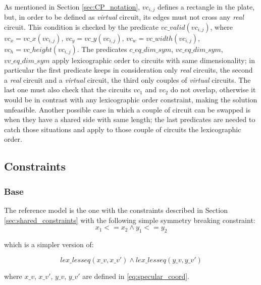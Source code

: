 \hfill \\
As mentioned in Section \ref{sec:CP_notation}, $vc_{i,j}$ defines a rectangle in the plate, but, in order to
be defined as \textit{virtual} circuit, its edges must not cross any \textit{real} circuit.
This condition is checked by the predicate $vc\_valid(vc_{i,j})$, where
$vc_x = vc\_x(vc_{i,j})$, $vc_y = vc\_y(vc_{i,j})$, $vc_w = vc\_width(vc_{i,j})$, $vc_h = vc\_height(vc_{i,j})$.
The predicates $c\_eq\_dim\_sym$, $vc\_eq\_dim\_sym$, $vv\_eq\_dim\_sym$ apply
lexicographic order to circuits with same dimensionality; in particular the first predicate keeps in consideration only
\textit{real} circuits, the second a \textit{real} circuit and a \textit{virtual} circuit, the third only couples of
\textit{virtual} circuits. The last one must also check that the circuits $vc_1$ and $vc_2$ do not overlap,
otherwise it would be in contrast with any lexicographic order constraint, making the solution unfeasible.
Another possible case in which a couple of circuit can be swapped is when they have a shared side with same length;
the last predicates are needed to catch those situations and apply to those couple of circuits the lexicographic order.


\subsection{Constraints}
\subsubsection{Base} \label{sec:CP_base}
The reference model is the one with the constraints described in Section \ref{sec:shared_constraints}
with the following simple symmetry breaking constraint:
\begin{equation*}
  x_1 <= x_2 \land y_1 <= y_2
\end{equation*}

which is a simpler version of:

\begin{equation*}
  lex\_lesseq(x\_v, x\_v') \land lex\_lesseq(y\_v, y\_v')
\end{equation*}

where $x\_v$, $x\_v'$, $y\_v$, $y\_v'$ are defined in \ref{eq:specular_coord}.


